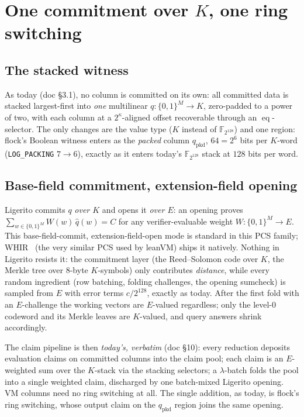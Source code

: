 \documentclass[11pt]{article}
\newcommand{\F}{\mathbb{F}}
\newcommand{\K}{K}            %
\newcommand{\E}{E}            %
\newcommand{\eq}{\operatorname{eq}}
\newcommand{\cube}[1]{\{0,1\}^{#1}}
\newcommand{\pkd}{\mathrm{pkd}}
\begin{document}
\section{One commitment over $\K$, one ring switching}\label{sec:rs}

\subsection{The stacked witness}\label{sec:lists}

As today (doc \S3.1), no column is committed on its own: all committed
data is stacked largest-first into \emph{one} multilinear
$q:\cube{M}\to\K$, zero-padded to a power of two, with each column at a
$2^\kappa$-aligned offset recoverable through an $\eq$-selector. The only
changes are the value type ($\K$ instead of $\F_{2^{128}}$) and one
region: flock's Boolean witness enters as the \emph{packed} column
$q_\pkd$, $64=2^6$ bits per $\K$-word (\texttt{LOG\_PACKING} $7\to6$),
exactly as it enters today's $\F_{2^{128}}$ stack at $128$ bits per word.

\subsection{Base-field commitment, extension-field opening}\label{sec:pipeline}

Ligerito commits $q$ \emph{over $\K$} and opens it \emph{over $\E$}: an
opening proves $\sum_{w\in\cube{M}} W(w)\,\widehat q(w)=C$ for any
verifier-evaluable weight $W:\cube{M}\to\E$. This base-field-commit,
extension-field-open mode is standard in this PCS family; WHIR~\cite{whir}
(the very similar PCS used by leanVM) ships it natively. Nothing in
Ligerito resists it: the commitment layer (the Reed--Solomon code over
$\K$, the Merkle tree over 8-byte $\K$-symbols) only contributes
\emph{distance}, while every random ingredient (row batching, folding
challenges, the opening sumcheck) is sampled from $\E$ with error terms
$c/2^{128}$, exactly as today. After the first fold with an $\E$-challenge
the working vectors are $\E$-valued regardless; only the level-0 codeword
and its Merkle leaves are $\K$-valued, and query answers shrink
accordingly.

The claim pipeline is then \emph{today's, verbatim} (doc \S10): every
reduction deposits evaluation claims on committed columns into the claim
pool; each claim is an $\E$-weighted sum over the $\K$-stack via the
stacking selectors; a $\lambda$-batch folds the pool into a single
weighted claim, discharged by one batch-mixed Ligerito opening. VM columns
need no ring switching at all. The single addition, as today, is flock's
ring switching, whose output claim on the $q_\pkd$ region joins the same
opening.
\end{document}
